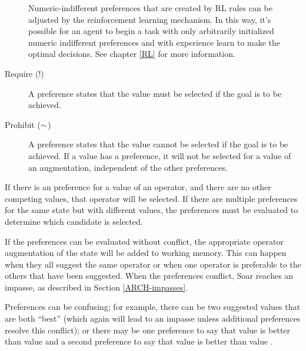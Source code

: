 \begin{description}
	Numeric-indifferent preferences that are created by RL rules can be adjusted
	by the reinforcement learning mechanism. In this way, it's possible for an
	agent to begin a task with only arbitrarily initialized numeric indifferent
	preferences and with experience learn to make the optimal decisions. See
	chapter \ref{RL} for more information.
	
\item [Require (!)] A  preference states that the value must be
        selected if the goal is to be achieved.\vspace{-8pt}

\item [Prohibit ($\sim$)] A  preference states that the value 
cannot
        be selected if the goal is to be achieved.  If a value has a
         preference, it will not be selected for a value of an
        augmentation, independent of the other preferences.\vspace{-8pt}
\end{description}


If there is an
\/ preference for a value of an operator, and there are no
other competing values, that operator will be selected.  If there are
multiple \/ preferences for the same state but with
different values, the preferences must be evaluated to determine which
candidate is selected.

If the preferences can be evaluated without conflict, the appropriate
operator augmentation of the state will be added to working
memory. This can happen when they all suggest the same operator or when
one operator is preferable to the others that have been suggested. When
the preferences conflict, Soar reaches an impasse, as described in
Section \ref{ARCH-impasses}.

Preferences can be confusing; for example, there can be two suggested
values that are both ``best'' (which again will lead to an impasse
unless additional preferences resolve this conflict); or there may be
one preference to say that value  is better than value 
and a second preference to say that value  is better than value
.

